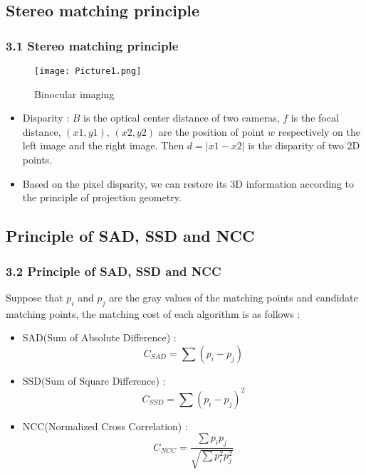 \documentclass{beamer}
\begin{document}
\subsection{Stereo matching principle}
\begin{frame}
\frametitle{3.1 Stereo matching principle}
\begin{multicols}{2}


\begin{figure}[!htp]
\centering
\texttt{[image: Picture1.png]}
\caption{Binocular imaging}\label{fig 1}
\end{figure}

\columnbreak
\begin{itemize}
\item Disparity : $B$ is the optical center distance of two cameras, $f$ is the focal distance, $(x1,y1)$, $(x2,y2)$ are the position of point $w$ respectively on the left image and the right image. Then $d=|x1-x2|$ is the disparity of two 2D points.

\item Based on the pixel disparity, we can restore its 3D information according to the principle of projection geometry.
\end{itemize}
\end{multicols}
\end{frame}

\subsection{Principle of SAD, SSD and NCC}
\begin{frame}
\frametitle{3.2 Principle of SAD, SSD and NCC}
Suppose that $p_i$ and $p_j$ are the gray values of the matching points and candidate matching points, the matching cost of each algorithm is as follows :
\begin{itemize}
\item SAD(Sum of Absolute Difference) :
\begin{equation}
C_{SAD}=\sum(p_i-p_j)
\end{equation}

\item SSD(Sum of Square Difference) :
\begin{equation}
C_{SSD}=\sum(p_i-p_j)^2
\end{equation}

\item NCC(Normalized Cross Correlation) :
\begin{equation}
C_{NCC}=\frac{\sum p_ip_j}{\sqrt{\sum p_i^2 p_j^2}}
\end{equation}
\end{itemize}
\end{frame}
\end{document}
